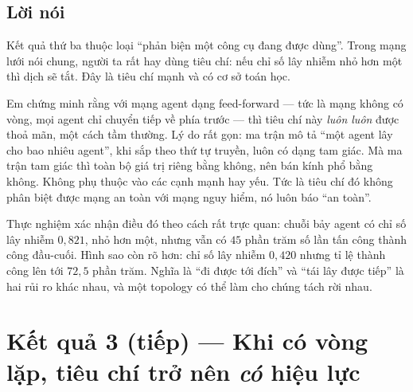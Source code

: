 \documentclass[11pt,a4paper]{article}
\newcommand{\slide}[1]{\section{#1}}
\newcommand{\loinoi}{\subsection*{Lời nói}}
\begin{document}
\loinoi
Kết quả thứ ba thuộc loại ``phản biện một công cụ đang được dùng''. Trong mạng lưới
nói chung, người ta rất hay dùng tiêu chí: nếu chỉ số lây nhiễm nhỏ hơn một thì dịch
sẽ tắt. Đây là tiêu chí mạnh và có cơ sở toán học.

Em chứng minh rằng với mạng agent dạng feed-forward --- tức là mạng không có vòng, mọi
agent chỉ chuyển tiếp về phía trước --- thì tiêu chí này \emph{luôn luôn} được thoả
mãn, một cách tầm thường. Lý do rất gọn: ma trận mô tả ``một agent lây cho bao nhiêu
agent'', khi sắp theo thứ tự truyền, luôn có dạng tam giác. Mà ma trận tam giác thì
toàn bộ giá trị riêng bằng không, nên bán kính phổ bằng không. Không phụ thuộc vào các
cạnh mạnh hay yếu. Tức là tiêu chí đó không phân biệt được mạng an toàn với mạng nguy
hiểm, nó luôn báo ``an toàn''.

Thực nghiệm xác nhận điều đó theo cách rất trực quan: chuỗi bảy agent có chỉ số lây
nhiễm $0{,}821$, nhỏ hơn một, nhưng vẫn có $45$ phần trăm số lần tấn công thành công
đầu-cuối. Hình sao còn rõ hơn: chỉ số lây nhiễm $0{,}420$ nhưng tỉ lệ thành công lên
tới $72{,}5$ phần trăm. Nghĩa là ``đi được tới đích'' và ``tái lây được tiếp'' là hai
rủi ro khác nhau, và một topology có thể làm cho chúng tách rời nhau.

\slide{Kết quả 3 (tiếp) --- Khi có vòng lặp, tiêu chí trở nên \emph{có} hiệu lực}
\end{document}
